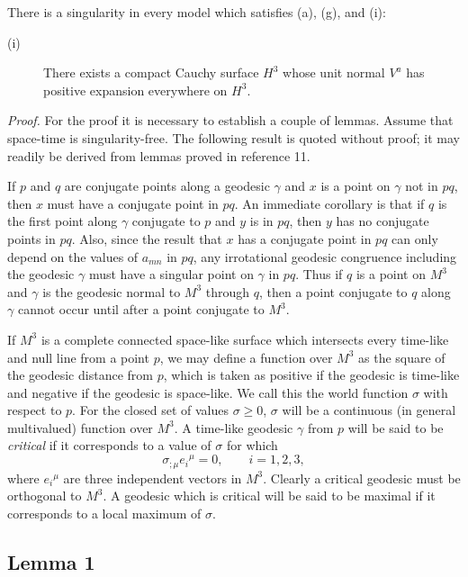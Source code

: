 \setcounter{section}{7}

There is a singularity in every model which satisfies (a), (g), and (i):
\begin{description}
\item[(i)] There exists a compact Cauchy surface $H^3$ whose unit normal $V^a$
has positive expansion everywhere on $H^3$.
\end{description}

\emph{Proof.} For the proof it is necessary to establish a couple of lemmas.
Assume that space-time is singularity-free. The following result is quoted
without proof; it may readily be derived from lemmas proved in reference 11.

If $p$ and $q$ are conjugate points along a geodesic $\gamma$ and $x$ is a
point on $\gamma$ not in $pq$, then $x$ must have a conjugate point in $pq$.
An immediate corollary is that if $q$ is the first point along $\gamma$
conjugate to $p$ and $y$ is in $pq$, then $y$ has no conjugate points in $pq$.
Also, since the result that $x$ has a conjugate point in $pq$ can only depend
on the values of $a_{mn}$ in $pq$, any irrotational geodesic congruence
including the geodesic $\gamma$ must have a singular point on $\gamma$ in
$pq$. Thus if $q$ is a point on $M^3$ and $\gamma$ is the geodesic normal to
$M^3$ through $q$, then a point conjugate to $q$ along $\gamma$ cannot occur
until after a point conjugate to $M^3$.

If $M^3$ is a complete connected space-like surface which intersects every
time-like and null line from a point $p$, we may define a function over $M^3$
as the square of the geodesic distance from $p$, which is taken as positive if
the geodesic is time-like and negative if the geodesic is space-like. We call
this the world function $\sigma$ with respect to $p$. For the closed set of
values $\sigma\geq0$, $\sigma$ will be a continuous (in general multivalued)
function over $M^3$. A time-like geodesic $\gamma$ from $p$ will be said to be
\emph{critical} if it corresponds to a value of $\sigma$ for which
\[
\sigma_{;\mu}e_i{}^\mu=0,
\qquad i=1,2,3,
\]
where $e_i{}^\mu$ are three independent vectors in $M^3$. Clearly a critical
geodesic must be orthogonal to $M^3$. A geodesic which is critical will be
said to be maximal if it corresponds to a local maximum of $\sigma$.

\subsection*{Lemma 1}

